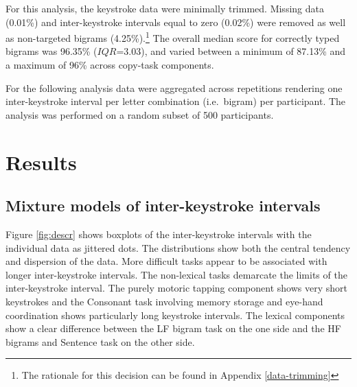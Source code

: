 \documentclass[,man,floatsintext]{apa6}
\let\rmarkdownfootnote\footnote%
\def\footnote{\protect\rmarkdownfootnote}
\begin{document}
For this analysis, the keystroke data were minimally trimmed. Missing data (0.01\%) and inter-keystroke intervals equal to zero (0.02\%) were removed as well as non-targeted bigrams (4.25\%).\footnote{The rationale for this decision can be found in Appendix \ref{data-trimming}} The overall median score for correctly typed bigrams was 96.35\% (\(IQR\)=3.03), and varied between a minimum of 87.13\% and a maximum of 96\% across copy-task components.

For the following analysis data were aggregated across repetitions rendering one inter-keystroke interval per letter combination (i.e.~bigram) per participant. The analysis was performed on a random subset of 500 participants.

\hypertarget{results}{%
\section{Results}\label{results}}

\hypertarget{mixture-models-of-inter-keystroke-intervals}{%
\subsection{Mixture models of inter-keystroke intervals}\label{mixture-models-of-inter-keystroke-intervals}}

Figure \ref{fig:descr} shows boxplots of the inter-keystroke intervals with the individual data as jittered dots. The distributions show both the central tendency and dispersion of the data. More difficult tasks appear to be associated with longer inter-keystroke intervals. The non-lexical tasks demarcate the limits of the inter-keystroke interval. The purely motoric tapping component shows very short keystrokes and the Consonant task involving memory storage and eye-hand coordination shows particularly long keystroke intervals. The lexical components show a clear difference between the LF bigram task on the one side and the HF bigrams and Sentence task on the other side.
\end{document}
